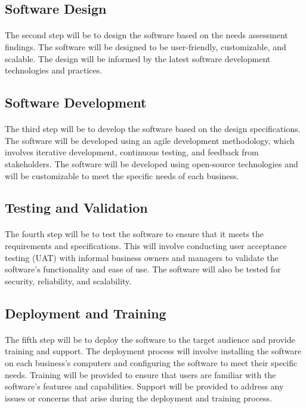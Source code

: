 \documentclass{article}
\begin{document}
\subsection{Software Design}
\paragraph*{}
The second step will be to design the software based on the needs assessment findings. The software will be designed to be user-friendly, customizable, and scalable. The design will be informed by the latest software development technologies and practices.

\subsection{Software Development}
\paragraph*{}
The third step will be to develop the software based on the design specifications. The software will be developed using an agile development methodology, which involves iterative development, continuous testing, and feedback from stakeholders. The software will be developed using open-source technologies and will be customizable to meet the specific needs of each business.

\subsection{Testing and Validation}
\paragraph*{}
The fourth step will be to test the software to ensure that it meets the requirements and specifications. This will involve conducting user acceptance testing (UAT) with informal business owners and managers to validate the software's functionality and ease of use. The software will also be tested for security, reliability, and scalability.

\subsection{Deployment and Training}
\paragraph*{}
The fifth step will be to deploy the software to the target audience and provide training and support. The deployment process will involve installing the software on each business's computers and configuring the software to meet their specific needs. Training will be provided to ensure that users are familiar with the software's features and capabilities. Support will be provided to address any issues or concerns that arise during the deployment and training process.
\end{document}
